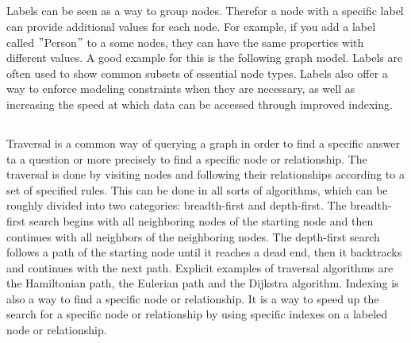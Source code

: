 \subsection{} \label{subsec:labels}
Labels can be seen as a way to group nodes.
Therefor a node with a specific label can provide additional values for each node.
For example, if you add a label called \("\)Person\("\) to a some nodes, they can have the same properties with different values.
A good example for this is the following graph model.
Labels are often used to show common subsets of essential node types.
Labels also offer a way to enforce modeling constraints when they are necessary, as well as increasing the speed at which data
can be accessed through improved indexing. \cite[compare P. 6f. ]{PractivalNeo4j}
\subsection{}\label{subsec:tbd{traversal-and-indexing}}
Traversal is a common way of querying a graph in order to find a specific answer ta a question or more precisely to find a
specific node or relationship.
The traversal is done by visiting nodes and following their relationships according to a set of specified rules\cite[compare P.7 ]{PractivalNeo4j}.
This can be done in all sorts of algorithms, which can be roughly divided into two categories: breadth-first and depth-first.
The breadth-first  search begins with all neighboring nodes of the starting node and then continues with all neighbors of the neighboring nodes.
The depth-first search follows a path of the starting node until it reaches a dead end, then it backtracks and continues with the next path.
Explicit examples of traversal algorithms are the Hamiltonian path, the Eulerian path and the Dijkstra algorithm\cite[compare]{juypiter:Graph}.
Indexing is also a way to find a specific node or relationship.
It is a way to speed up the search for a specific node or relationship by using specific indexes on a labeled node or relationship\cite[compare P.7 ]{PractivalNeo4j}.
